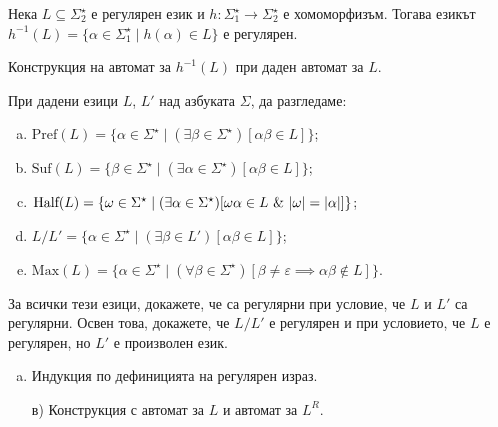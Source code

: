 \begin{problem}
  Нека $L\subseteq \Sigma^\star_2$ е регулярен език и $h:\Sigma^\star_1\to\Sigma^\star_2$ е хомоморфизъм.
  Тогава езикът
  $h^{-1}(L) = \{\alpha \in \Sigma^\star_1 \mid h(\alpha) \in L\}$ е регулярен.  
\end{problem}
\begin{hint}
  Конструкция на автомат за $h^{-1}(L)$ при даден автомат за $L$.
\end{hint}

\begin{problem}
  При дадени езици $L$, $L'$ над азбуката $\Sigma$, да разгледаме:
  \begin{enumerate}[a)]
  \item
    $\mbox{Pref}(L) = \{\alpha \in \Sigma^\star \mid (\exists \beta \in \Sigma^\star)[\alpha\beta \in L]\}$;
  \item
    $\mbox{Suf}(L) = \{\beta \in \Sigma^\star \mid (\exists \alpha \in \Sigma^\star)[\alpha\beta \in L]\}$;
  \item 
    $\mbox{Half}(L) = \{\omega \in \Sigma^\star \mid (\exists \alpha \in \Sigma^\star)[\omega\alpha \in L\ \&\ \abs{\omega} = \abs{\alpha}]\}$;
  \item
    $L/L' = \{\alpha \in \Sigma^\star \mid (\exists \beta \in L')[\alpha\beta \in L]\}$;
  \item
    $\mbox{Max}(L) = \{\alpha \in \Sigma^\star \mid (\forall \beta\in\Sigma^\star)[\beta \neq \varepsilon\implies \alpha\beta \not\in L]\}$.
  \end{enumerate}
  За всички тези езици, докажете, че са регулярни при условие, че $L$ и $L'$ са регулярни.
  Освен това, докажете, че $L/L'$ е регулярен и при условието, че $L$ е регулярен, но $L'$ е произволен език.
\end{problem}
\begin{hint}
  \begin{enumerate}[a)]
  \item 
    Индукция по дефиницията на регулярен израз.
  \item[в)]
    Конструкция с автомат за $L$ и автомат за $L^R$.
  \end{enumerate}
\end{hint}

